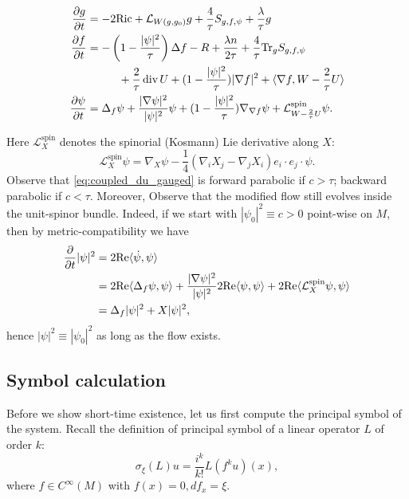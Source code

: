 \documentclass{amsart}
\theoremstyle{definition}
\theoremstyle{remark}
\numberwithin{equation}{section}
\newcommand{\Ric}{\textup{Ric}}
\newcommand{\Tr}{\textup{Tr}}
\renewcommand{\div}{\,\textup{div}}
\newcommand{\D}[2]{\frac{\partial #1}{\partial #2}}
\begin{document}
\begin{align}
\label{eq:coupled_dg_gauged}\D{g}{t} & = -2\Ric + \mathcal{L}_{W(g,g_0)}g   + \frac{4}{\tau}S_{g,f,\psi} + \frac{\lambda}{\tau}g\\
\label{eq:coupled_du_gauged}\D{f}{t} & =   -\left( 1 - \frac{|\psi|^2}{\tau}\right)\Delta f - R + \frac{\lambda n}{2\tau} +\frac{4}{\tau} \Tr_g S_{g,f,\psi}\\
& \hskip 1cm + \frac{2}{\tau}\div\, U + (1-\frac{|\psi|^2}{\tau})|\nabla f|^2 + \langle \nabla f, W - \frac{2}{\tau}U\rangle \nonumber\\
\label{eq:coupled_dpsi_gauged}\D{\psi}{t} & =  \Delta_f \psi +\frac{|\nabla\psi|^2}{|\psi|^2}\psi  +(1-\frac{|\psi|^2}{\tau})\nabla_{\nabla f}\psi + \mathcal{L}_{W- \frac{2}{\tau}U}^{\text{spin}}\psi. 
\end{align}

Here $\mathcal{L}_X^{\text{spin}}$ denotes the spinorial (Kosmann) Lie derivative along $X$:
	\[	\mathcal{L}_X^{\text{spin}} \psi = \nabla_X\psi - \frac{1}{4}(\nabla_iX_j - \nabla_jX_i)e_i\cdot e_j\cdot\psi.\]
Observe that \eqref{eq:coupled_du_gauged} is forward parabolic if $c>\tau$; backward parabolic if $c<\tau$. Moreover, Observe that the modified flow still evolves inside the unit-spinor bundle. Indeed, if we start with $|\psi_0|^2 \equiv c>0$ point-wise on $M$, then by metric-compatibility we have 
\begin{equation}\label{eqn;spinor_norm_preserved_under_gauge}
	\begin{aligned}
			\frac{\partial}{\partial t}|\psi|^2 &= 2\textup{Re}\langle \dot\psi, \psi\rangle\\
	&= 2\textup{Re}\langle \Delta_f\psi, \psi\rangle + \frac{|\nabla\psi|^2}{|\psi|^2}2\textup{Re}\langle \psi, \psi\rangle + 2\textup{Re}\langle \mathcal{L}_{X}^{\text{spin}} \psi, \psi\rangle\\
	&= \Delta_f|\psi|^2 + X|\psi|^2,
	\end{aligned}
\end{equation}
hence $|\psi|^2 \equiv |\psi_0|^2$ as long as the flow exists.
\medskip

\subsection{Symbol calculation}

Before we show short-time existence, let us first compute the principal symbol of the system. Recall the definition of principal symbol of a linear operator $L$ of order $k$:
	\[	\sigma_{\xi}(L)u = \frac{i^k}{k!}L(f^k u)(x),\]
where $f\in C^{\infty}(M)$ with $f(x) = 0, df_x = \xi$.
\end{document}
